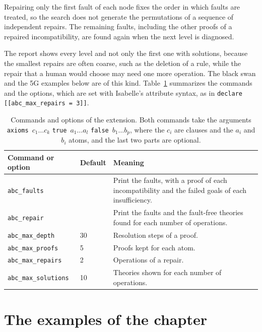 \documentclass[preprint,12pt]{elsarticle}
\newcommand{\isa}[1]{\texttt{#1}}
\begin{document}
Repairing only the first fault of each node fixes the order in which faults
are treated, so the search does not generate the permutations of a
sequence of independent repairs. The remaining faults, including the other
proofs of a repaired incompatibility, are found again when the next level
is diagnosed.

The report shows every level and not only the first one with solutions,
because the smallest repairs are often coarse, such as the deletion of a
rule, while the repair that a human would choose may need one more
operation. The black swan and the 5G examples below are of this kind.
Table~\ref{tab:commands} summarizes the commands and the options, which are
set with Isabelle's attribute syntax, as in
\isa{declare [[abc\_max\_repairs = 3]]}.

\begin{table}[t]
\centering
\small
\begin{tabularx}{\textwidth}{@{}l l X@{}}
\toprule
Command or option & Default & Meaning \\
\midrule
\isa{abc\_faults} & & Print the faults, with a proof of each
  incompatibility and the failed goals of each insufficiency. \\
\isa{abc\_repair} & & Print the faults and the fault-free theories found
  for each number of operations. \\
\isa{abc\_max\_depth} & 30 & Resolution steps of a proof. \\
\isa{abc\_max\_proofs} & 5 & Proofs kept for each atom. \\
\isa{abc\_max\_repairs} & 2 & Operations of a repair. \\
\isa{abc\_max\_solutions} & 10 & Theories shown for each number of
  operations. \\
\bottomrule
\end{tabularx}
\caption{Commands and options of the extension. Both commands take the
arguments \isa{axioms}~$c_1 \dots c_k$ \isa{true}~$a_1 \dots a_l$
\isa{false}~$b_1 \dots b_p$, where the $c_i$ are clauses and the $a_i$ and
$b_i$ atoms, and the last two parts are optional.}
\label{tab:commands}
\end{table}

\section{The examples of the chapter}
\label{sec:examples}
\end{document}
